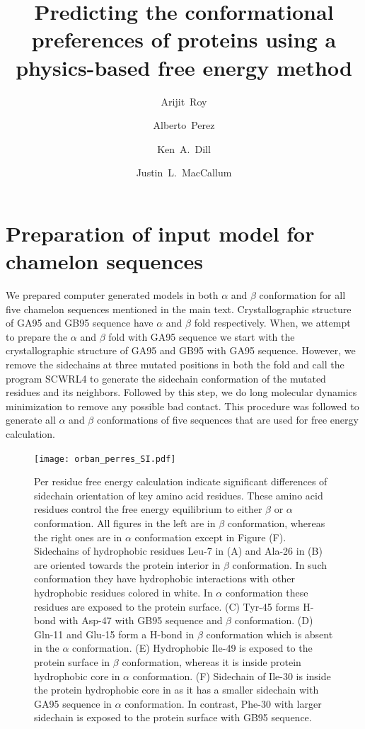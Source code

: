 \documentclass[12pt]{article}
\author{Arijit~Roy}
\author{Alberto~Perez}
\author{Ken~A.~Dill}
\author{Justin~L.~MacCallum}
\affil{Laufer Center for Physical and Quantitative Biology\\
    and Departments of Physics and Chemistry\\
    Stony Brook University\\
    Stony Brook, NY 11794-5252.}
\title{Predicting the conformational preferences of proteins using a physics-based free energy
method}
\begin{document}
\maketitle


\section{Preparation of input model for chamelon sequences}

We prepared computer generated models in both $\alpha$ and $\beta$ conformation for all five chamelon sequences mentioned 
in the main text. Crystallographic structure of GA95 and GB95 sequence have $\alpha$ and $\beta$ fold respectively. When,
we attempt to prepare the $\alpha$ and $\beta$ fold with GA95 sequence we start with the crystallographic 
structure of GA95 and GB95 with GA95 sequence. However, we remove the sidechains at three mutated positions in both the fold 
and call the program SCWRL4 \cite{Krivov2009} to generate the sidechain conformation of the mutated residues and its neighbors. Followed by 
this step, we do long molecular dynamics
minimization to remove any possible bad contact. This procedure was followed to generate all $\alpha$ and 
$\beta$ conformations of five sequences that are used for free energy calculation.   


\begin{figure}
\texttt{[image: orban\_perres\_SI.pdf]}
\label{fig:orban_full}
\caption{Per residue free energy calculation indicate significant differences of sidechain orientation of key amino acid residues. These amino acid
residues control the free energy equilibrium to either $\beta$ or
$\alpha$ conformation. All figures in the left are in $\beta$ conformation, whereas the right ones are in $\alpha$ conformation except in Figure (F).
Sidechains of hydrophobic residues Leu-7 in (A) and Ala-26 in (B) are oriented towards the protein interior in $\beta$ 
conformation. In such conformation they have hydrophobic interactions with other hydrophobic residues colored in white. In $\alpha$ conformation these residues are 
exposed to the protein surface. 
(C) Tyr-45 forms H-bond with Asp-47 with GB95 sequence and $\beta$ conformation. (D) Gln-11 and Glu-15 form a H-bond in $\beta$ conformation which is absent
in the $\alpha$ conformation. (E) Hydrophobic Ile-49 is exposed to the protein surface in $\beta$ conformation, whereas it is inside protein hydrophobic core in
$\alpha$ conformation. (F) Sidechain of Ile-30 is inside the protein hydrophobic core in as it has a smaller sidechain with GA95 sequence in $\alpha$ conformation. 
In contrast, Phe-30 with larger sidechain is exposed to the protein surface with GB95 sequence.}
\end{figure}
\end{document}
